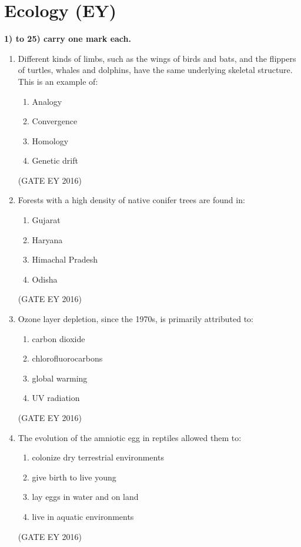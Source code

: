 \documentclass[journal]{IEEEtran}
\begin{document}
\section*{\textbf{Ecology (EY)}}
\begin{flushleft}
\textbf{1) to 25) carry one mark each.}
    \end{flushleft}
\begin{enumerate}

\item Different kinds of limbs, such as the wings of birds and bats, and the flippers of turtles, whales and dolphins, have the same underlying skeletal structure. This is an example of:
\begin{multicols}{4}
\begin{enumerate}
    \item Analogy
    \item Convergence
    \item Homology
    \item Genetic drift
\end{enumerate}
\end{multicols}
\hfill{(GATE EY 2016)}

\item Forests with a high density of native conifer trees are found in:
\begin{multicols}{2}
\begin{enumerate}
    \item Gujarat
    \item Haryana
    \item Himachal Pradesh
    \item Odisha
\end{enumerate}
\end{multicols}
\hfill{(GATE EY 2016)}

\item Ozone layer depletion, since the 1970s, is primarily attributed to:
\begin{multicols}{2}
\begin{enumerate}
    \item carbon dioxide
    \item chlorofluorocarbons
    \item global warming
    \item UV radiation
\end{enumerate}
\end{multicols}
\hfill{(GATE EY 2016)}

\item The evolution of the amniotic egg in reptiles allowed them to:
\begin{enumerate}
    \item colonize dry terrestrial environments
    \item give birth to live young
    \item lay eggs in water and on land
    \item live in aquatic environments
\end{enumerate}
\hfill{(GATE EY 2016)}


\end{enumerate}
\end{document}
